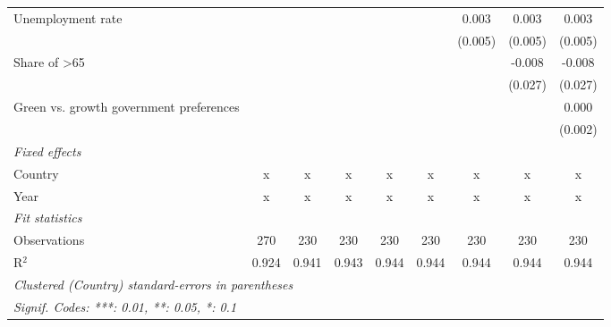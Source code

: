 \begin{table}[htbp]
\begin{tabular}{lcccccccc}
      Unemployment rate                       &         &         &               &               &               & 0.003         & 0.003         & 0.003\\   
                                              &         &         &               &               &               & (0.005)       & (0.005)       & (0.005)\\   
      Share of >65                            &         &         &               &               &               &               & -0.008        & -0.008\\   
                                              &         &         &               &               &               &               & (0.027)       & (0.027)\\   
      Green vs. growth government preferences &         &         &               &               &               &               &               & 0.000\\   
                                              &         &         &               &               &               &               &               & (0.002)\\   
      \emph{Fixed effects}\\
      Country                                 & x       & x       & x             & x             & x             & x             & x             & x\\  
      Year                                    & x       & x       & x             & x             & x             & x             & x             & x\\  
      \midrule \emph{Fit statistics}\\
      Observations                            & 270     & 230     & 230           & 230           & 230           & 230           & 230           & 230\\  
      R$^2$                                   & 0.924   & 0.941   & 0.943         & 0.944         & 0.944         & 0.944         & 0.944         & 0.944\\  
      \midrule
      \multicolumn{9}{l}{\emph{Clustered (Country) standard-errors in parentheses}}\\
      \multicolumn{9}{l}{\emph{Signif. Codes: ***: 0.01, **: 0.05, *: 0.1}}\\
   \end{tabular}
\end{table}


